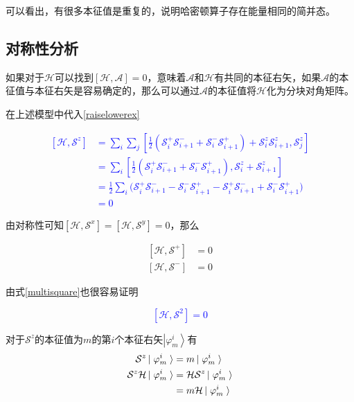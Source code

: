 \documentclass[UTF8,12pt]{article}
\providecommand\Ket[1]{\left|\right. #1 \left.\right\rangle}
\numberwithin{equation}{subsection}
\providecommand{\empB}[1]{\textcolor{blue}{#1}}
\providecommand{\sumL}{\sum\limits}
\begin{document}
	可以看出，有很多本征值是重复的，说明哈密顿算子存在能量相同的简并态。
	\subsection{对称性分析}
	如果对于$\mathcal H$可以找到$[\mathcal H,\mathcal A]=0$，意味着$\mathcal A$和$\mathcal H$有共同的本征右矢，如果$\mathcal A$的本征值与本征右矢是容易确定的，那么可以通过$\mathcal A$的本征值将$\mathcal H$化为分块对角矩阵。
	
	在上述模型中代入\ref{raiselowerex}
	\begin{snugshade}
		\empB{\begin{equation}
			\begin{aligned}
				\left[\mathcal H,\mathcal S^z\right]&= \sumL_i\sumL_j\left[\frac{1}{2}(\mathcal S^+_i\mathcal S^-_{i+1}+\mathcal S^-_i\mathcal S^+_{i+1})+\mathcal S^z_i\mathcal S^z_{i+1},\mathcal S^z_j\right]\\
				&= \sumL_i\left[\frac{1}{2}(\mathcal S^+_i\mathcal S^-_{i+1}+\mathcal S^-_i\mathcal S^+_{i+1}),\mathcal S^z_i+\mathcal S^z_{i+1}\right]\\
				&=\frac{1}{2}\sumL_i\Big(\mathcal S^+_i\mathcal S^-_{i+1}-\mathcal S^-_i\mathcal S^+_{i+1}-\mathcal S^+_i\mathcal S^-_{i+1}+\mathcal S^-_i\mathcal S^+_{i+1}\Big)\\
				&=0
			\end{aligned}
			\label{symmetricZ}
		\end{equation}}
	\end{snugshade}
	由对称性可知$[\mathcal H,\mathcal S^x]=[\mathcal H,\mathcal S^y]=0$，那么
	
	\begin{snugshade}
		\begin{subequations}
			\begin{align}
				\left[\mathcal H,\mathcal S^+\right]&=0\label{symmetricRaise}\\
				\left[\mathcal H,\mathcal S^-\right]&=0\label{symmetricLower}
			\end{align}
		\end{subequations}
	\end{snugshade}

	由式\ref{multisquare}也很容易证明\begin{snugshade}
		\empB{\begin{equation}
				\left[\mathcal H,\mathcal S^2\right]=0
			\label{symmetricSquare}
		\end{equation}}
	\end{snugshade}
	对于$\mathcal S^z$的本征值为$m$的第$i$个本征右矢$\Ket{\varphi^i_m}$有\begin{align}
			\mathcal S^z\Ket{\varphi^i_m}&=m\Ket{\varphi^i_m}\label{einSz}\\
			\mathcal S^z\mathcal H\Ket{\varphi^i_m}&=\mathcal{HS}^z\Ket{\varphi^i_m}\notag\\ 
								 &=m\mathcal H\Ket{\varphi^i_m}\notag
	\end{align}
\end{document}
